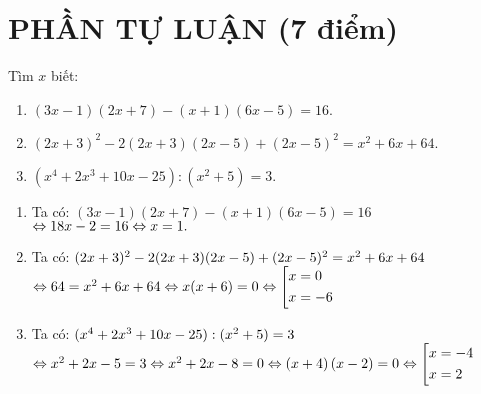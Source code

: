 \section{PHẦN TỰ LUẬN (7 điểm)}
\begin{ex}%
	Tìm $x$ biết: 
	\begin{enumerate}
	\item $(3x-1)(2x+7)-(x+1)(6x-5)=16.$
	\item $(2x+3)^2-2(2x+3)(2x-5)+(2x-5)^2=x^2+6x+64.$
	\item $(x^4+2x^3+10x-25):(x^2+5)=3.$
	\end{enumerate}
\loigiai
{
\begin{enumerate}
\item Ta có:
$(3x-1)(2x+7)-(x+1)(6x-5)=16$\\$\Leftrightarrow 18x-2=16\\\Leftrightarrow x=1.$
\item Ta có:
$(2x+3)^2-2(2x+3)(2x-5)+(2x-5)^2=x^2+6x+64\\$
$\Leftrightarrow 64=x^2+6x+64\\
\Leftrightarrow x(x+6)=0\\
\Leftrightarrow \left[ \begin{aligned}
& x=0 \\ 
& x=-6 \\ 
\end{aligned} \right.$
\item 
Ta có: 
$(x^4+2x^3+10x-25):(x^2+5)=3\\$
$\Leftrightarrow x^2+2x-5=3\\
\Leftrightarrow x^2+2x-8=0\\
\Leftrightarrow \left(x+4\right)\left(x-2\right)=0\\
\Leftrightarrow \left[\begin{aligned}
&x=-4\\
&x=2\\
\end{aligned}\right.$
\end{enumerate}
}
\end{ex}
